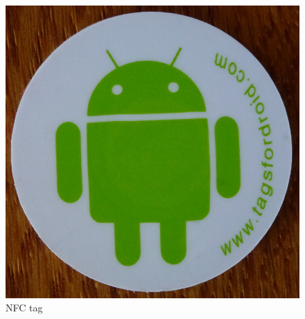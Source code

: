 \documentclass[numbers=noenddot, abstract=on, a4paper, headsepline,
footsepline, oneside, openright, draft=off, listof=leveldown]{scrreprt}
\begin{document}
\begin{figure}[!htb]
\begin{minipage}{.5\textwidth}
		\includegraphics[height=.2\textheight]{img/nfc_tag}
		\caption{NFC tag}
		\label{fig:handbook_nfctag}
	\end{minipage}
\end{figure}
\end{document}
